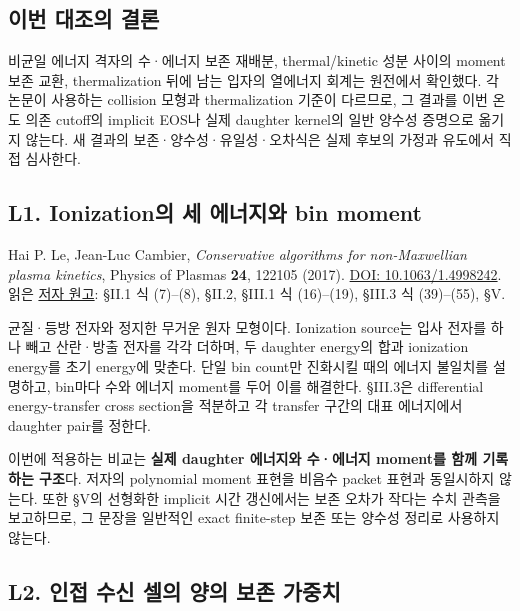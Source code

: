 \hypertarget{uxc774uxbc88-uxb300uxc870uxc758-uxacb0uxb860}{%
\subsection{이번 대조의 결론}\label{uxc774uxbc88-uxb300uxc870uxc758-uxacb0uxb860}}

비균일 에너지 격자의 수·에너지 보존 재배분, thermal/kinetic 성분 사이의 moment 보존 교환, thermalization 뒤에 남는 입자의 열에너지 회계는 원전에서 확인했다. 각 논문이 사용하는 collision 모형과 thermalization 기준이 다르므로, 그 결과를 이번 온도 의존 cutoff의 implicit EOS나 실제 daughter kernel의 일반 양수성 증명으로 옮기지 않는다. 새 결과의 보존·양수성·유일성·오차식은 실제 후보의 가정과 유도에서 직접 심사한다.

\hypertarget{l1.-ionizationuxc758-uxc138-uxc5d0uxb108uxc9c0uxc640-bin-moment}{%
\subsection{L1. Ionization의 세 에너지와 bin moment}\label{l1.-ionizationuxc758-uxc138-uxc5d0uxb108uxc9c0uxc640-bin-moment}}

Hai P. Le, Jean-Luc Cambier, \emph{Conservative algorithms for non-Maxwellian plasma kinetics}, Physics of Plasmas \textbf{24}, 122105 (2017). \href{https://doi.org/10.1063/1.4998242}{DOI: 10.1063/1.4998242}. 읽은 \href{https://ar5iv.labs.arxiv.org/html/1711.05946}{저자 원고}: §II.1 식 (7)--(8), §II.2, §III.1 식 (16)--(19), §III.3 식 (39)--(55), §V.

균질·등방 전자와 정지한 무거운 원자 모형이다. Ionization source는 입사 전자를 하나 빼고 산란·방출 전자를 각각 더하며, 두 daughter energy의 합과 ionization energy를 초기 energy에 맞춘다. 단일 bin count만 진화시킬 때의 에너지 불일치를 설명하고, bin마다 수와 에너지 moment를 두어 이를 해결한다. §III.3은 differential energy-transfer cross section을 적분하고 각 transfer 구간의 대표 에너지에서 daughter pair를 정한다.

이번에 적용하는 비교는 \textbf{실제 daughter 에너지와 수·에너지 moment를 함께 기록하는 구조}다. 저자의 polynomial moment 표현을 비음수 packet 표현과 동일시하지 않는다. 또한 §V의 선형화한 implicit 시간 갱신에서는 보존 오차가 작다는 수치 관측을 보고하므로, 그 문장을 일반적인 exact finite-step 보존 또는 양수성 정리로 사용하지 않는다.

\hypertarget{l2.-uxc778uxc811-uxc218uxc2e0-uxc140uxc758-uxc591uxc758-uxbcf4uxc874-uxac00uxc911uxce58}{%
\subsection{L2. 인접 수신 셀의 양의 보존 가중치}\label{l2.-uxc778uxc811-uxc218uxc2e0-uxc140uxc758-uxc591uxc758-uxbcf4uxc874-uxac00uxc911uxce58}}

